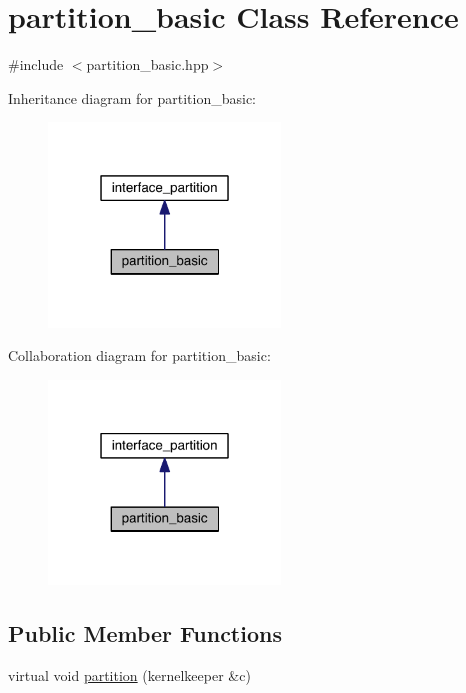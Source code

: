 \hypertarget{classpartition__basic}{}\section{partition\+\_\+basic Class Reference}
\label{classpartition__basic}


{\ttfamily \#include $<$partition\+\_\+basic.\+hpp$>$}



Inheritance diagram for partition\+\_\+basic\+:
\nopagebreak
\begin{figure}[H]
\begin{center}
\leavevmode
\includegraphics[width=175pt]{classpartition__basic__inherit__graph}
\end{center}
\end{figure}


Collaboration diagram for partition\+\_\+basic\+:
\nopagebreak
\begin{figure}[H]
\begin{center}
\leavevmode
\includegraphics[width=175pt]{classpartition__basic__coll__graph}
\end{center}
\end{figure}
\subsection*{Public Member Functions}
\begin{DoxyCompactItemize}
\item 
virtual void \hyperlink{classpartition__basic_a3dc4106326788887f9a7c6ac49bb46d4}{partition} (kernelkeeper \&c)
\end{DoxyCompactItemize}
